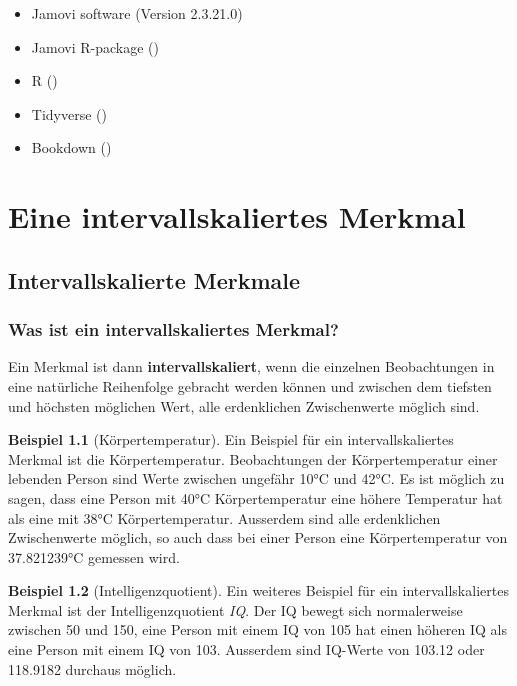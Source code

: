 \documentclass[
]{book}
\providecommand{\tightlist}{%
  \setlength{\itemsep}{0pt}\setlength{\parskip}{0pt}}
\theoremstyle{definition}
\theoremstyle{definition}
\newtheorem{example}{Beispiel}[chapter]
\theoremstyle{definition}
\theoremstyle{definition}
\theoremstyle{remark}
\begin{document}
\begin{itemize}
\tightlist
\item
  Jamovi software (Version 2.3.21.0)
\item
  Jamovi R-package ()
\item
  R ()
\item
  Tidyverse ()
\item
  Bookdown ()
\end{itemize}

\part{Eine intervallskaliertes Merkmal}\label{part-eine-intervallskaliertes-merkmal}

\chapter{Intervallskalierte Merkmale}\label{intervallskalierte-merkmale}

\section{Was ist ein intervallskaliertes Merkmal?}\label{intervallskalierte-merkmale-definition}

\label{customdef-intervallskaliert}{Ein Merkmal ist dann \textbf{intervallskaliert}, wenn die einzelnen Beobachtungen in eine natürliche Reihenfolge gebracht werden können und zwischen dem tiefsten und höchsten möglichen Wert, alle erdenklichen Zwischenwerte möglich sind.}

\begin{example}[Körpertemperatur]
\protect\hypertarget{exm:humtemp}{}\label{exm:humtemp}Ein Beispiel für ein intervallskaliertes Merkmal ist die Körpertemperatur. Beobachtungen der Körpertemperatur einer lebenden Person sind Werte zwischen ungefähr 10°C und 42°C. Es ist möglich zu sagen, dass eine Person mit 40°C Körpertemperatur eine höhere Temperatur hat als eine mit 38°C Körpertemperatur. Ausserdem sind alle erdenklichen Zwischenwerte möglich, so auch dass bei einer Person eine Körpertemperatur von 37.821239°C gemessen wird.
\end{example}

\begin{example}[Intelligenzquotient]
\protect\hypertarget{exm:iq}{}\label{exm:iq}Ein weiteres Beispiel für ein intervallskaliertes Merkmal ist der Intelligenzquotient \emph{IQ}. Der IQ bewegt sich normalerweise zwischen 50 und 150, eine Person mit einem IQ von 105 hat einen höheren IQ als eine Person mit einem IQ von 103. Ausserdem sind IQ-Werte von 103.12 oder 118.9182 durchaus möglich.
\end{example}
\end{document}
